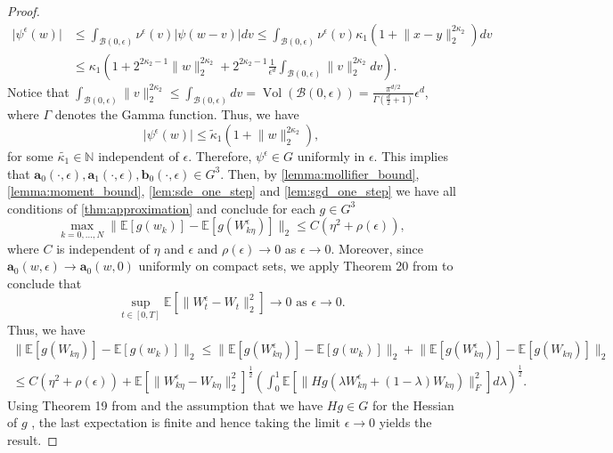 \documentclass[12pt]{article}
\theoremstyle{definition}
\numberwithin{equation}{section}
\newcommand{\N}{\mathbb{N}}
\newcommand{\CB}{\mathcal{B}}
\newcommand{\moll}{\nu^{\epsilon}}
\newcommand{\ev}[1]{\mathbb{E}\left[{#1}\right]}
\newcommand{\norm}[1]{\lVert{#1}\rVert_2}
\newcommand{\normf}[1]{\lVert{#1}\rVert_F}
\DeclareMathOperator{\vol}{Vol}
\begin{document}
\begin{proof}
  \begin{align*}
    \lvert \psi^{\epsilon}(w) \rvert &\leq \int_{\CB(0, \epsilon)} \moll(v) \lvert \psi(w-v) \rvert dv \leq \int_{\CB(0, \epsilon)} \moll(v) \kappa_1 (1 + \norm{x-y}^{2\kappa_2})dv\\
    &\leq \kappa_1\left(1 + 2^{2\kappa_2 - 1} \norm{w}^{2\kappa_2} + 2^{2\kappa_2 - 1}\frac{1}{\epsilon^d}\int_{\CB(0,\epsilon)}\norm{v}^{2\kappa_2}dv\right).
  \end{align*}
  Notice that $\int_{\CB(0,\epsilon)}\norm{v}^{2\kappa_2} \leq \int_{\CB(0,\epsilon)}dv = \vol(\CB(0,\epsilon)) = \frac{\pi^{d/2}}{\Gamma(\frac{d}{2}+1)}\epsilon^d$, where $\Gamma$ denotes the Gamma function. Thus, we have
  \begin{equation*}
    \lvert \psi^{\epsilon}(w) \rvert \leq \widetilde{\kappa}_1(1+ \norm{w}^{2\kappa_2}),
  \end{equation*}
  for some $\widetilde{\kappa_1} \in \N$ independent of $\epsilon$.
  Therefore, $\psi^{\epsilon} \in G$ uniformly in $\epsilon$.
  This implies that $\mathbf{a}_0(\cdot,\epsilon), \mathbf{a}_1(\cdot,\epsilon),\mathbf{b}_0(\cdot, \epsilon) \in G^3$.
  Then, by \autoref{lemma:mollifier_bound}, \autoref{lemma:moment_bound}, \autoref{lem:sde_one_step} and \autoref{lem:sgd_one_step} we have all conditions of \autoref{thm:approximation} and conclude for each $g \in G^3$
  \begin{equation*}
    \max_{k=0,\dots,N}\norm{\ev{g(w_k)} - \ev{g(W^{\epsilon}_{k\eta})}} \leq C(\eta^2 + \rho(\epsilon)),
  \end{equation*}
  where $C$ is independent of $\eta$ and $\epsilon$ and $\rho(\epsilon) \rightarrow 0$ as $\epsilon \rightarrow 0$. Moreover, since $\mathbf{a}_0(w, \epsilon) \rightarrow \mathbf{a}_0(w, 0)$ uniformly on compact sets, we apply Theorem 20 from \cite{liStochasticModifiedEquations2019} to conclude that
  \begin{equation*}
    \sup_{t \in [0,T]}\ev{\norm{W^{\epsilon}_t - W_t}^2} \rightarrow 0 \text{ as } \epsilon \rightarrow 0.
  \end{equation*}
  Thus, we have
  \begin{multline*}
    \norm{\ev{g(W_{k\eta})} - \ev{g(w_k)}} \leq  \norm{\ev{g(W_{k\eta}^\epsilon)} - \ev{g(w_k)}} + \norm{\ev{g(W_{k\eta}^{\epsilon})} - \ev{g(W_{k\eta})}} \\
    \leq C(\eta^2 + \rho(\epsilon))
    + \ev{\norm{W^{\epsilon}_{k\eta} - W_{k\eta}}^2}^{\frac{1}{2}} \left( \int_0^1 \ev{\normf{Hg(\lambda W^{\epsilon}_{k\eta} + (1-\lambda)W_{k\eta})}^2}d\lambda\right)^{\frac{1}{2}}.
  \end{multline*}
  Using Theorem 19 from \cite{liStochasticModifiedEquations2019} and the assumption that we have $Hg \in G$ for the Hessian of $g$ , the last expectation is finite and hence taking the limit $\epsilon \rightarrow 0$ yields the result.
\end{proof}
\end{document}
